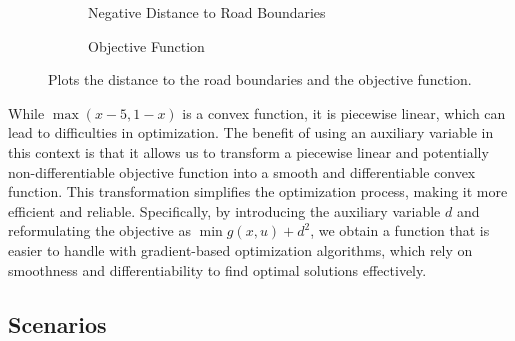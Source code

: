 \begin{figure}[H]
	\centering
	\begin{subfigure}{0.48\textwidth}
		\centering
		\caption{Negative Distance to Road Boundaries}
		\label{fig:road_boundaries}
	\end{subfigure}
	\hfill
	\begin{subfigure}{0.48\textwidth}
		\centering
		\caption{Objective Function}
		\label{fig:objective_functions}
	\end{subfigure}
	\caption{Plots the distance to the road boundaries and the objective function.}
	\label{fig:auxiliary_variables}
\end{figure}

While \(\max(x-5, 1-x)\) is a convex function, it is piecewise linear, which can lead to difficulties in optimization.
The benefit of using an auxiliary variable in this context is that it allows us to transform a piecewise linear and potentially non-differentiable
objective function into a smooth and differentiable convex function.
This transformation simplifies the optimization process, making it more efficient and reliable.
Specifically, by introducing the auxiliary variable \( d \) and reformulating the objective as \(\min g(x, u) + d^2\), we obtain a function that is
easier to handle with gradient-based optimization algorithms, which rely on smoothness and differentiability to find optimal solutions effectively.

\subsection{Scenarios} \label{subsec:scenarios}

